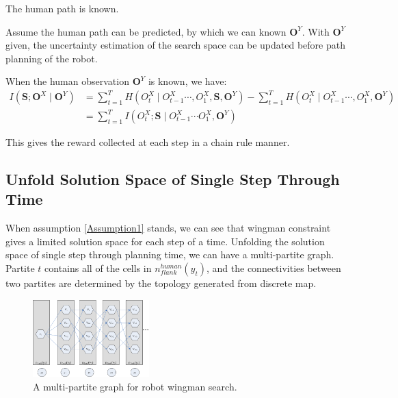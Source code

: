 \documentclass[12pt]{article}
\begin{document}
\begin{defn}
\label{Assumption1}

The human path is known.

\end{defn}

Assume the human path can be predicted, by which we can known $ \textbf{O}^{Y} $. With $ \textbf{O}^{Y} $ given, the uncertainty estimation of the search space can be updated before path planning of the robot. 

\begin{lem} 
\label{Lemma1}
When the human observation $ \textbf{O}^{Y} $ is known, we have:
\begin{equation}
\label{eq:offHmPathChain}
\begin{aligned}
I(\textbf{S}; \textbf{O}^{X} \mid \textbf{O}^{Y}) & = \sum_{t=1}^{T} H(O_{t}^{X} \mid O_{t-1}^{X} \cdots, O_{1}^{X}, \textbf{S}, \textbf{O}^{Y}) - \sum_{t=1}^{T} H(O_{t}^{X} \mid O_{t-1}^{X} \cdots, O_{1}^{X}, \textbf{O}^{Y})\\
& = \sum_{t=1}^{T} I(O^{X}_{t} ; \textbf{S} \mid O^{X}_{t-1} \cdots O^{X}_{1}, \textbf{O}^{Y})
\end{aligned}
\end{equation}
\end{lem}

This gives the reward collected at each step in a chain rule manner. 

\subsection{Unfold Solution Space of Single Step Through Time}

When assumption \ref{Assumption1} stands, we can see that wingman constraint gives a limited solution space for each step of a time. Unfolding the solution space of single step through planning time, we can have a multi-partite graph. Partite $ t $ contains all of the cells in $ n^{human}_{flank}(y_{t}) $, and the connectivities between two partites are determined by the topology generated from discrete map.

\begin{figure}[htbp]
\centering
\includegraphics[width=0.4\textwidth]{./images/MultiPartite}
\caption{A multi-partite graph for robot wingman search.}
\label{fig:MultiPartite}
\end{figure}
\end{document}
